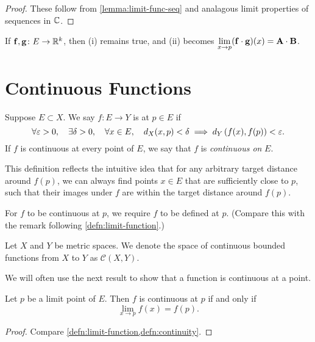 \begin{proof}
These follow from \ref{lemma:limit-func-seq} and analagous limit properties of sequences in $\mathbb C$.
\end{proof}

If $\vb{f},\vb{g}\colon E\to\mathbb R^k$, then (i) remains true, and (ii) becomes $\displaystyle\lim_{x\to p}(\vb{f}\cdot\vb{g})(x)=\vb{A}\cdot\vb{B}$.
\pagebreak

\section{Continuous Functions}
\begin{definition}[Continuity]\label{defn:continuity}
Suppose $E\subset X$. We say $f\colon E\to Y$ is  at $p\in E$ if 
\[\forall\varepsilon>0,\quad\exists\delta>0,\quad\forall x\in E,\quad d_X(x,p)<\delta\implies d_Y\left(f(x),f(p)\right)<\varepsilon.\]
If $f$ is continuous at every point of $E$, we say that $f$ is \emph{continuous on} $E$.
\end{definition}

This definition reflects the intuitive idea that for any arbitrary target distance around $f(p)$, we can always find points $x\in E$ that are sufficiently close to $p$, such that their images under $f$ are within the target distance around $f(p)$.

\begin{remark}
For $f$ to be continuous at $p$, we require $f$ to be defined at $p$. (Compare this with the remark following \cref{defn:limit-function}.) 
\end{remark}

\begin{notation}
Let $X$ and $Y$ be metric spaces. We denote the space of continuous bounded functions from $X$ to $Y$ as $\mathcal{C}(X,Y)$. 
\end{notation}

We will often use the next result to show that a function is continuous at a point.

\begin{lemma}\label{lemma:continuity-limit}
Let $p$ be a limit point of $E$. Then $f$ is continuous at $p$ if and only if
\[\lim_{x\to p}f(x)=f(p).\]
\end{lemma}

\begin{proof}
Compare \cref{defn:limit-function,defn:continuity}.
\end{proof}

